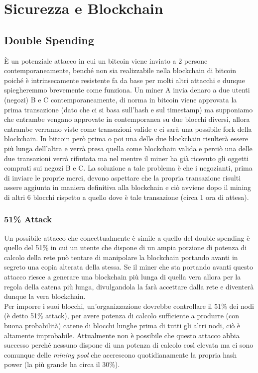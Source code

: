 \section{Sicurezza e Blockchain}

\subsection{Double Spending}

È un potenziale attacco in cui un bitcoin viene inviato a 2 persone
contemporaneamente, benché non sia realizzabile nella blockchain di bitcoin
poiché è intrinsecamente resistente fa da base per molti altri attacchi e dunque
spiegheremmo brevemente come funziona. Un miner A invia denaro a due utenti (negozi) B e C contemporaneamente, di norma in bitcoin viene approvata la prima transazione
(dato che ci si basa sull'hash e sul timestamp) ma supponiamo che entrambe vengano approvate in contemporanea su due blocchi diversi, allora entrambe verranno viste come transazioni valide e ci sarà una possibile fork della
blockchain. In bitcoin però prima o poi una delle due blockchain risulterà essere più lunga dell'altra e verrà presa quella come blockchain valida e perciò una delle due transazioni verrà rifiutata ma nel mentre il miner ha già ricevuto gli oggetti comprati sui negozi B e C. La soluzione a tale problema è che i negozianti, prima di inviare le proprie merci, devono aspettare che la propria transazione risulti assere aggiunta in maniera definitiva alla blockchain e ciò avviene dopo il mining di altri 6 blocchi rispetto a quello dove è tale transazione (circa 1 ora di attesa).

\subsubsection{51\% Attack}

Un possibile attacco che concettualmente è simile a quello del double spending è
quello del 51\% in cui un utente che dispone di un ampia porzione di potenza di
calcolo della rete può tentare di manipolare la blockchain portando avanti in
segreto una copia alterata della stessa. Se il miner che sta portando avanti
questo attacco riesce a generare una blockchain più lunga di quella vera allora
per la regola della catena più lunga, divulgandola la farà accettare dalla rete
e diventerà dunque la vera blockchain.\\
Per imporre i suoi blocchi, un'organizzazione dovrebbe controllare il 51\% dei
nodi (è detto 51\% attack), per avere potenza di calcolo sufficiente a produrre
(con buona probabilità) catene di blocchi lunghe prima di tutti gli altri nodi,
ciò è altamente improbabile. Attualmente non è possibile che questo attacco abbia successo perché nessuno dispone di una potenza di calcolo così elevata ma ci sono comunque delle \emph{mining pool} che accrescono quotidianamente la propria hash power (la più grande ha circa il 30\%).

